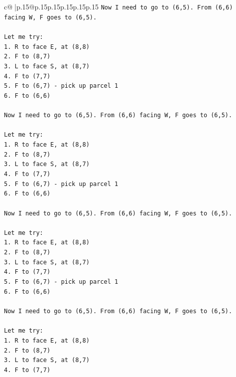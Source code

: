 \documentclass{article}
\begin{document}
{\begin{supertabular}{c@{$\;$}|p{.15\linewidth}@{}p{.15\linewidth}p{.15\linewidth}p{.15\linewidth}p{.15\linewidth}p{.15\linewidth}}
{{{\texttt{Now I need to go to (6,5). From (6,6) facing W, F goes to (6,5).} \\
\\ 
\texttt{Let me try:} \\
\texttt{1. R to face E, at (8,8)} \\
\texttt{2. F to (8,7)} \\
\texttt{3. L to face S, at (8,7)} \\
\texttt{4. F to (7,7)} \\
\texttt{5. F to (6,7) {-} pick up parcel 1} \\
\texttt{6. F to (6,6)} \\
\\ 
\texttt{Now I need to go to (6,5). From (6,6) facing W, F goes to (6,5).} \\
\\ 
\texttt{Let me try:} \\
\texttt{1. R to face E, at (8,8)} \\
\texttt{2. F to (8,7)} \\
\texttt{3. L to face S, at (8,7)} \\
\texttt{4. F to (7,7)} \\
\texttt{5. F to (6,7) {-} pick up parcel 1} \\
\texttt{6. F to (6,6)} \\
\\ 
\texttt{Now I need to go to (6,5). From (6,6) facing W, F goes to (6,5).} \\
\\ 
\texttt{Let me try:} \\
\texttt{1. R to face E, at (8,8)} \\
\texttt{2. F to (8,7)} \\
\texttt{3. L to face S, at (8,7)} \\
\texttt{4. F to (7,7)} \\
\texttt{5. F to (6,7) {-} pick up parcel 1} \\
\texttt{6. F to (6,6)} \\
\\ 
\texttt{Now I need to go to (6,5). From (6,6) facing W, F goes to (6,5).} \\
\\ 
\texttt{Let me try:} \\
\texttt{1. R to face E, at (8,8)} \\
\texttt{2. F to (8,7)} \\
\texttt{3. L to face S, at (8,7)} \\
\texttt{4. F to (7,7)} \\
}}}
\end{supertabular}}
\end{document}
